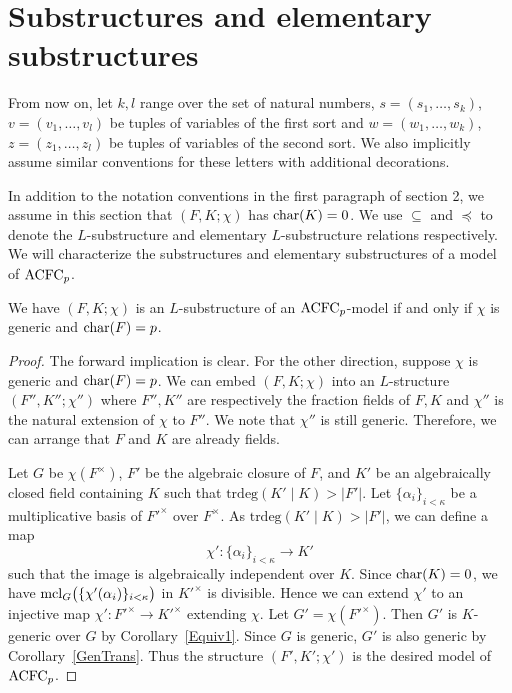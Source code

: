 \section{Substructures and elementary substructures}
\noindent
From now on, let $k, l$ range over the set of natural numbers, $s=(s_1, \ldots, s_k)$, $v =(v_1, \ldots, v_l)$ be tuples of variables of the first sort and $w= (w_1, \ldots, w_k)$, $z = (z_1, \ldots, z_l)$ be tuples of variables of the second sort. We also implicitly assume similar conventions for these letters with additional decorations.

\noindent In addition to the notation conventions in the first paragraph of section 2, we assume in this section that $(F, K; \chi)$ has $\mathrm{char}(K)=0$. We use $\subseteq$ and $\preccurlyeq$ to denote the $L$-substructure and elementary $L$-substructure relations respectively. 
We will characterize the substructures and elementary substructures of a model of $\mathrm{ACFC}_p$. 



\begin{prop} \label{Substructures}
We have $(F, K; \chi)$ is an $L$-substructure of an $\mathrm{ACFC}_p$-model if and only if $\chi$ is generic and $\mathrm{char}(F)=p$.
\end{prop}

\begin{proof}
The forward implication is clear. For the other direction, suppose $\chi$ is generic and $\mathrm{char}(F)=p$. We can embed $(F, K; \chi)$ into an $L$-structure $(F'', K'';\chi'')$ where $F'', K'' $ are respectively the fraction fields of $F, K$ and $\chi''$ is the natural extension of $\chi$ to $F''$. We note that $\chi''$ is still generic. Therefore, we can arrange that $F$ and $K$ are already fields.


Let $G$ be $ \chi(F^\times)$, $F'$ be the algebraic closure of $F$, and  $K'$ be an algebraically closed field containing $K$  such that $\text{trdeg}(K' \mid K)>|F'|$. Let $\{\alpha_i \}_{ i < \kappa}$ be a multiplicative basis of ${F'}^\times$ over $F^\times$. As $\text{trdeg}(K'\mid K)>|F'|$, we can define a map $$\chi': \{\alpha_i \}_{ i < \kappa} \to K'$$ such that the image is algebraically independent over $K$.
Since $\mathrm{char}(K)=0$, we have $\mathrm{mcl}_G\big(\{ \chi'(\alpha_i) \}_{ i < \kappa}\big)$ in ${K'}^\times$ is divisible. Hence we can extend $\chi'$ to an injective map $\chi': {F'}^\times \to {K'}^\times$ extending $\chi$. Let $G' = \chi({F'}^\times)$.
Then $G'$ is $K$-generic over $G$ by Corollary~\ref{Equiv1}.
Since $G $ is generic, $G'$ is also generic by Corollary~\ref{GenTrans}. Thus the structure $(F', K'; \chi')$ is the desired model of $\mathrm{ACFC}_p$.
\end{proof}


